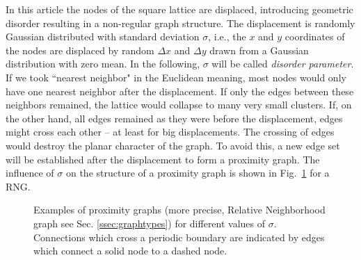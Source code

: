     In this article the nodes of the square lattice are
    displaced, introducing geometric disorder resulting in a non-regular graph
    structure.
    The displacement is randomly Gaussian distributed with standard
    deviation \(\sigma\), i.e., the \(x\) and \(y\) coordinates of the
    nodes are displaced by random \(\Delta x\) and \(\Delta y\) drawn
    from a Gaussian distribution with zero mean.
    In the following, \(\sigma\) will be called \emph{disorder parameter}.
    If we took ``nearest neighbor" in the Euclidean meaning, most nodes
    would only have one nearest neighbor after the
    displacement. If only the edges between these neighbors remained,
    the lattice would collapse to many very small clusters. If, on the
    other hand, all edges remained as they were before the displacement,
    edges might cross each other -- at least for big displacements.
    The crossing of edges would destroy the planar character of the graph.
    To avoid this, a new edge set will be established after the displacement
    to form a proximity graph. The influence of $\sigma$ on the
    structure of a proximity graph is shown in Fig.~\ref{fig:RNG_sigma}
    for a RNG.
    \begin{figure}[htb]
        \centering
        \caption[Examples of RNG for different $\sigma$]
        {
            Examples of proximity graphs (more precise, Relative Neighborhood
            graph see Sec. \ref{ssec:graphtypes}) for different values of $\sigma$.
            Connections which cross a periodic boundary are indicated
            by edges which connect a solid node to a dashed node.
        }
        \label{fig:RNG_sigma}
    \end{figure}
